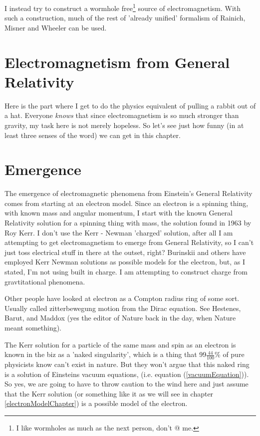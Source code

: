 \documentclass[../rzero]{subfiles}
\begin{document}
I instead try to construct a wormhole free\footnote{I like wormholes as much as the next person, don't @ me.} source of  electromagnetism. With such a construction, much of the rest of 'already unified' formalism of Rainich, Misner and Wheeler can be used.

\section{Electromagnetism from General Relativity}
Here is the part where I get to do the physics equivalent of pulling a rabbit out of a hat. Everyone \textit{knows} that since electromagnetism is so much stronger than gravity, my task here is not merely hopeless. So let's see just how funny (in at least three senses of the word) we can get in this chapter. 


\section{Emergence}
The emergence of electromagnetic phenomena from Einstein's General Relativity comes from starting at an electron model. Since an electron is a spinning thing, with known mass and angular momentum, I start with the known General Relativity solution for a spinning thing with mass, the  solution found in 1963 by Roy Kerr\cite{kerrGravitationalFieldSpinning1963}. I don't use the Kerr - Newman 'charged' solution\cite{newmanNoteKerrSpinningParticle1965}, after all I am attempting to get electromagnetism to emerge from General Relativity, so I can't just toss electrical stuff in there at the outset, right? Burinskii\cite{Burinskii2008} and others have employed Kerr Newman solutions as possible models for the electron, but, as I stated, I'm not using built in charge. I am attempting to construct charge from gravtitational phenomena.

Other people have looked at electron as a Compton radius ring of some sort. Usually called zitterbewegung motion from the Dirac equation\cite{diracQuantumTheoryElectron1997}. See Hestenes\cite{Hestenes1990}, Barut\cite{Barut1984}, and Maddox\cite{Maddox1987} (yes the editor of Nature back in the day, when Nature meant something).

The Kerr solution for a particle of the same mass and spin as an electron is known in the biz as a 'naked singularity', which is a thing that 99$\frac{44}{100}$\% of pure physicists know can't exist in nature. But they won't argue that this naked ring is a solution of Einsteins vacuum equations, (i.e. equation (\ref{vacuumEquation})). So yes, we are going to have to throw caution to the wind here and just assume that the Kerr solution (or something like it as we will see in chapter \ref{electronModelChapter}) is a possible model of the electron. 
\end{document}
